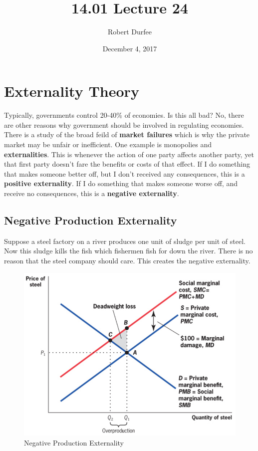 \documentclass{article}
\title{ 14.01 Lecture 24 }
\author{ Robert Durfee }
\date{ December 4, 2017 }
\begin{document}
\maketitle

\section{ Externality Theory }

Typically, governments control 20-40\% of economies. Is this all bad? No, there
are other reasons why government should be involved in regulating economies.
There is a study of the broad feild of \textbf{market failures} which is why
the private market may be unfair or inefficient. One example is monopolies and
\textbf{externalities}. This is whenever the action of one party affects another
party, yet that first party doesn't fare the benefits or costs of that effect.
If I do something that makes someone better off, but I don't received any
consequences, this is a \textbf{positive externality}. If I do something that
makes someone worse off, and receive no consequences, this is a \textbf{negative
externality}.

\subsection{ Negative Production Externality }

Suppose a steel factory on a river produces one unit of sludge per unit of
steel. Now this sludge kills the fish which fishermen fish for down the river.
There is no reason that the steel company should care. This creates the negative
externality. 

\begin{figure}[H]
    \centering
    \includegraphics[scale=0.63]{"Negative Production Externality"}
    \caption{Negative Production Externality}
\end{figure}
\end{document}
